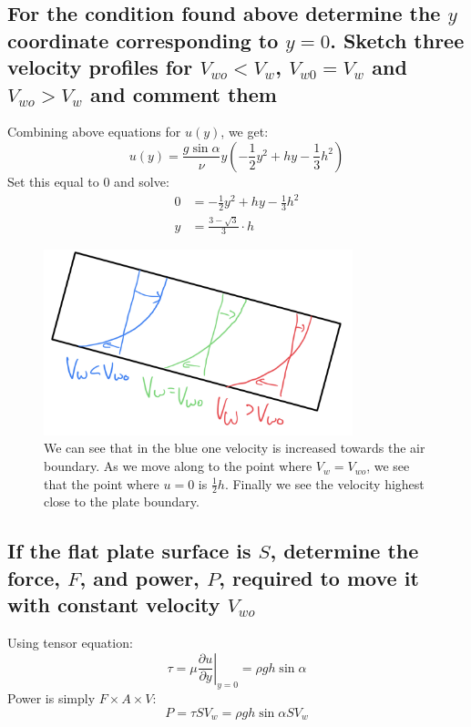 \documentclass[class=report, crop=false, 12pt,a4paper]{standalone}
\begin{document}
\subsection{For the condition found above determine the $y$ coordinate corresponding to $y=0$. Sketch three velocity profiles for $V_{wo} < V_w $, $V_{w0} = V_w$ and $V_{wo} > V_w$ and comment them}
Combining above equations for $u(y)$, we get:
\begin{equation}
  u(y) = \frac{g\sin{\alpha}}{\nu}y\left(-\frac{1}{2}y^2 + hy - \frac{1}{3}h^2\right)
\end{equation}
Set this equal to 0 and solve:
\begin{align}
  0 &= -\frac{1}{2}y^2 + hy - \frac{1}{3}h^2\\
  y &= \frac{3-\sqrt{3}}{3}\cdot h
\end{align}
\begin{figure}[H]
  \centering
  \includegraphics[width = 0.8\textwidth]{../img/velocityprofile004001.png}
  \caption{We can see that in the blue one velocity is increased towards the air boundary. As we move along to the point where $V_w = V_{wo}$, we see that the point where $u=0$ is $\frac{1}{2}h$. Finally we see the velocity highest close to the plate boundary.}
\end{figure}
\subsection{If the flat plate surface is $S$, determine the force, $F$, and power, $P$, required to move it with constant velocity $V_{wo}$}
Using tensor equation:
\begin{equation}
  \tau = \left. \mu \frac{\partial u}{\partial y}\right|_{y=0} = \rho g h \sin{\alpha}
\end{equation}
Power is simply $F \times A \times V$:
\begin{equation}
  P = \tau SV_w = \rho g h \sin{\alpha} SV_w
\end{equation}
\end{document}
